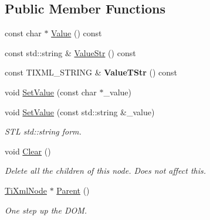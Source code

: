\subsection*{Public Member Functions}
\begin{DoxyCompactItemize}
\item 
const char $\ast$ \hyperlink{class_ti_xml_node_ad44dfe927d49a74dd78b72b7514417ad}{Value} () const
\item 
const std\+::string \& \hyperlink{class_ti_xml_node_a74bda074919e4a5e08d700204793f898}{Value\+Str} () const
\item 
\mbox{\label{class_ti_xml_node_a74c4ea4a91c0a91900c919f69f657d6a}} 
const T\+I\+X\+M\+L\+\_\+\+S\+T\+R\+I\+NG \& {\bfseries Value\+T\+Str} () const
\item 
void \hyperlink{class_ti_xml_node_a2a38329ca5d3f28f98ce932b8299ae90}{Set\+Value} (const char $\ast$\+\_\+value)
\item 
\mbox{\label{class_ti_xml_node_a2598d5f448042c1abbeae4503dd45ff2}} 
void \hyperlink{class_ti_xml_node_a2598d5f448042c1abbeae4503dd45ff2}{Set\+Value} (const std\+::string \&\+\_\+value)
\begin{DoxyCompactList}\small\item\em S\+TL std\+::string form. \end{DoxyCompactList}\item 
\mbox{\label{class_ti_xml_node_a708e7f953df61d4d2d12f73171550a4b}} 
void \hyperlink{class_ti_xml_node_a708e7f953df61d4d2d12f73171550a4b}{Clear} ()
\begin{DoxyCompactList}\small\item\em Delete all the children of this node. Does not affect \textquotesingle{}this\textquotesingle{}. \end{DoxyCompactList}\item 
\mbox{\label{class_ti_xml_node_ab643043132ffd794f8602685d34a982e}} 
\hyperlink{class_ti_xml_node}{Ti\+Xml\+Node} $\ast$ \hyperlink{class_ti_xml_node_ab643043132ffd794f8602685d34a982e}{Parent} ()
\begin{DoxyCompactList}\small\item\em One step up the D\+OM. \end{DoxyCompactList}\item 
\mbox{\label{class_ti_xml_node_af13df38878a5798142693d01d6133ba0}} 

\end{DoxyCompactItemize}
